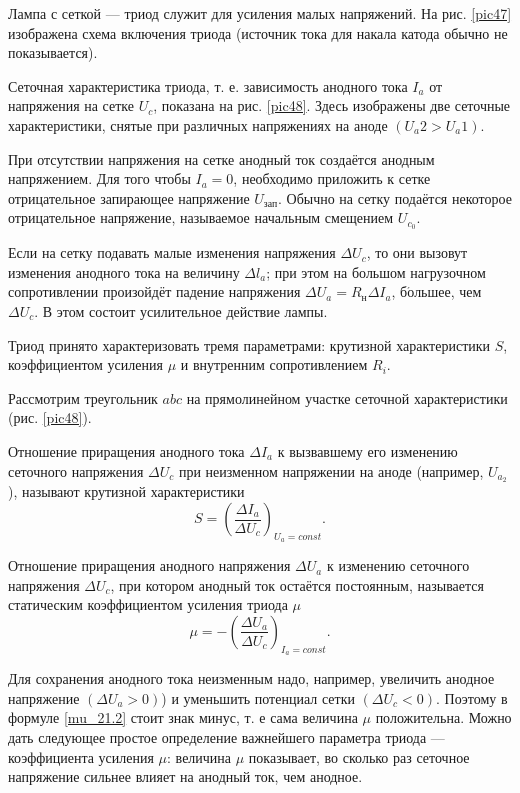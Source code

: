 \documentclass[a4paper,10pt]{book}
\begin{document}
Лампа с сеткой — триод служит для усиления малых напряжений. На рис. \ref{pic47} изображена схема включения триода (источник тока для накала катода обычно не показывается).

Сеточная характеристика триода, т. е. зависимость анодного тока $I_a$ от напряжения на сетке $U_c$, показана на рис. \ref{pic48}. Здесь изображены две сеточные характеристики, снятые при различных напряжениях на аноде $(U_a2>U_a1)$.

При отсутствии напряжения на сетке анодный ток создаётся анодным напряжением. Для того чтобы $I_a=0$, необходимо приложить к сетке отрицательное запирающее напряжение $U_\text{зап}$. Обычно на сетку подаётся некоторое отрицательное напряжение, называемое начальным смещением $U_{c_0}$.

Если на сетку подавать малые изменения напряжения $\Delta U_c$, то они вызовут изменения анодного тока на величину $\Delta l_a$; при этом на большом нагрузочном сопротивлении произойдёт падение напряжения $\Delta U_a=R_\text{н} \Delta I_a$, б$\acute{\text{о}}$льшее, чем $\Delta U_c$. В этом состоит усилительное действие лампы.

Триод принято характеризовать тремя параметрами: крутизной характеристики $S$, коэффициентом усиления $\mu$ и внутренним сопротивлением $R_i$.

Рассмотрим треугольник $abc$ на прямолинейном участке сеточной характеристики (рис. \ref{pic48}).

Отношение приращения анодного тока $\Delta I_a$ к вызвавшему его изменению сеточного напряжения $\Delta U_c$ при неизменном напряжении на аноде (например, $U_{a_2}$), называют крутизной характеристики
\begin{equation}
S = (\frac{\Delta I_a}{\Delta U_c})_{U_a=const}.
\end{equation}

Отношение приращения анодного напряжения $\Delta U_a$ к изменению сеточного напряжения $\Delta U_c$, при котором анодный ток остаётся постоянным, называется статическим коэффициентом усиления триода $\mu$ \begin{equation}\label{mu_21.2}
\mu = - (\frac{\Delta U_a}{\Delta U_c})_{I_a=const}.
\end{equation}

Для сохранения анодного тока неизменным надо, например, увеличить анодное напряжение $(\Delta U_a > 0)$) и уменьшить потенциал сетки $(\Delta U_c < 0)$. Поэтому в формуле \ref{mu_21.2} стоит знак минус, т. е сама величина $\mu$ положительна. Можно дать следующее простое определение важнейшего параметра триода — коэффициента усиления $\mu$: величина $\mu$ показывает, во сколько раз сеточное напряжение сильнее влияет на анодный ток, чем анодное.
\end{document}
